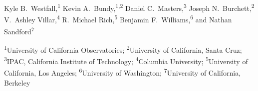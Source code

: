 Kyle B.\ Westfall,\textsuperscript{1}
Kevin A.\ Bundy,\textsuperscript{1,2}
Daniel C.\ Masters,\textsuperscript{3}
Joseph N.\ Burchett,\textsuperscript{2}
V.\ Ashley Villar,\textsuperscript{4}
R.\ Michael Rich,\textsuperscript{5}
Benjamin F.\ Williams,\textsuperscript{6}
and
Nathan Sandford\textsuperscript{7}

\begin{small}
\textsuperscript{1}University of California Observatories;
\textsuperscript{2}University of California, Santa Cruz;
\textsuperscript{3}IPAC, California Institute of Technology;
\textsuperscript{4}Columbia University;
\textsuperscript{5}University of California, Los Angeles;
\textsuperscript{6}University of Washington;
\textsuperscript{7}University of California, Berkeley
\end{small}

